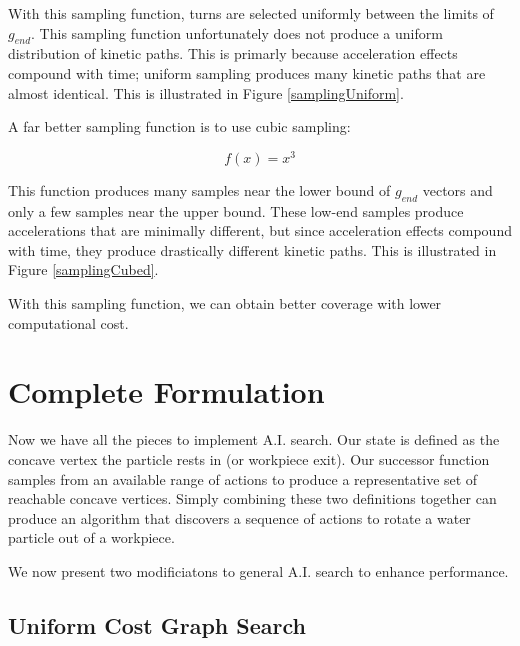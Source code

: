 With this sampling function, turns are selected uniformly between the limits of $g_{end}$. This sampling function unfortunately does not produce a uniform distribution of kinetic paths. This is primarly because acceleration effects compound with time; uniform sampling produces many kinetic paths that are almost identical. This is illustrated in Figure \ref{samplingUniform}.


A far better sampling function is to use cubic sampling:

$$
f(x) = x^3
$$

This function produces many samples near the lower bound of $g_{end}$ vectors and only a few samples near the upper bound. These low-end samples produce accelerations that are minimally different, but since acceleration effects compound with time, they produce drastically different kinetic paths. This is illustrated in Figure \ref{samplingCubed}.


With this sampling function, we can obtain better coverage with lower computational cost.

	\section{Complete Formulation}

Now we have all the pieces to implement A.I. search. Our state is defined as the concave vertex the particle rests in (or workpiece exit). Our successor function samples from an available range of actions to produce a representative set of reachable concave vertices. Simply combining these two definitions together can produce an algorithm that discovers a sequence of actions to rotate a water particle out of a workpiece.

We now present two modificiatons to general A.I. search to enhance performance.

	\subsection{Uniform Cost Graph Search}

